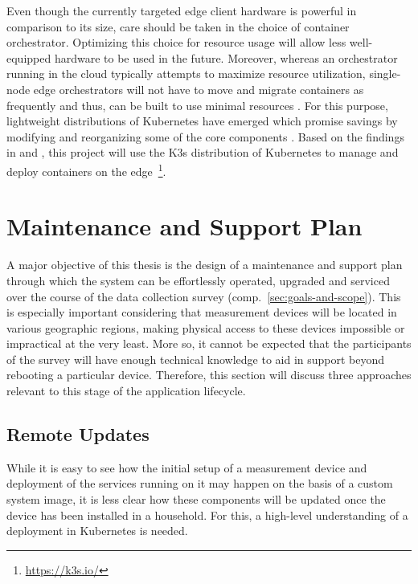Even though the currently targeted edge client hardware is powerful in comparison to its size, care should be taken in the choice of container orchestrator. Optimizing this choice for resource usage will allow less well-equipped hardware to be used in the future. Moreover, whereas an orchestrator running in the cloud typically attempts to maximize resource utilization, single-node edge orchestrators will not have to move and migrate containers as frequently and thus, can be built to use minimal resources \cite[p.~2]{goethals2019fledge}. For this purpose, lightweight distributions of Kubernetes have emerged which promise savings by modifying and reorganizing some of the core components \cite[pp.~65--66]{bohm2021profiling}. Based on the findings in \cite{bohm2021profiling} and \cite{goethals2019fledge}, this project will use the K3s distribution of Kubernetes to manage and deploy containers on the edge~\footnote{\url{https://k3s.io/}}.


\section{Maintenance and Support Plan}
\label{sec:maintenance-and-support-plan}

A major objective of this thesis is the design of a maintenance and support plan through which the system can be effortlessly operated, upgraded and serviced over the course of the data collection survey (comp.~\autoref{sec:goals-and-scope}). This is especially important considering that measurement devices will be located in various geographic regions, making physical access to these devices impossible or impractical at the very least. More so, it cannot be expected that the participants of the survey will have enough technical knowledge to aid in support beyond rebooting a particular device. Therefore, this section will discuss three approaches relevant to this stage of the application lifecycle.


\subsection{Remote Updates}

While it is easy to see how the initial setup of a measurement device and deployment of the services running on it may happen on the basis of a custom system image, it is less clear how these components will be updated once the device has been installed in a household. For this, a high-level understanding of a deployment in Kubernetes is needed.

